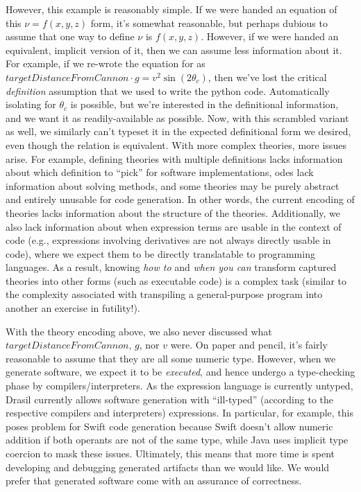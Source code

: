 However, this example is reasonably simple. If we were handed an equation of
this \(\nu{} = f(x,y,z)\) form, it's somewhat reasonable, but perhaps dubious
to assume that one way to define \(\nu{}\) is \(f(x,y,z)\). However, if we were
handed an equivalent, implicit version of it, then we can assume less
information about it. For example, if we re-wrote the equation for
 as \(\mathit{targetDistanceFromCannon}
\cdot{} g = v^2\sin{}(2\theta{}_c)\), then we've lost the critical
\textit{definition} assumption that we used to write the python code.
Automatically isolating for \(\theta_c\) is possible, but we're interested in
the definitional information, and we want it as readily-available as possible.
Now, with this scrambled variant as well, we similarly can't typeset it in the
expected definitional form we desired, even though the relation is equivalent.
With more complex theories, more issues arise. For example, defining theories
with multiple definitions lacks information about which definition to ``pick''
for software implementations, \acsp{ode} lack information about solving methods,
and some theories may be purely abstract and entirely unusable for code
generation. In other words, the current encoding of theories lacks information
about the structure of the theories. Additionally, we also lack information
about when expression terms are usable in the context of code (e.g., expressions
involving derivatives are not always directly usable in code), where we expect
them to be directly translatable to programming languages. As a result, knowing
\textit{how to} and \textit{when you can} transform captured theories into other
forms (such as executable code) is a complex task (similar to the complexity
associated with transpiling a general-purpose program into another \textemdash{}
an exercise in futility!).

With the theory encoding above, we also never discussed what
\(\mathit{targetDistanceFromCannon}\), \(g\), nor \(v\) were. On paper and
pencil, it's fairly reasonable to assume that they are all some numeric type.
However, when we generate software, we expect it to be \textit{executed}, and
hence undergo a type-checking phase by compilers/interpreters. As the expression
language is currently untyped, Drasil currently allows software generation with
``ill-typed'' (according to the respective compilers and interpreters)
expressions. In particular, for example, this poses problem for Swift code
generation because Swift doesn't allow numeric addition if both operants are not
of the same type, while Java uses implicit type coercion to mask these issues.
Ultimately, this means that more time is spent developing and debugging
generated artifacts than we would like. We would prefer that generated software
come with an assurance of correctness.

